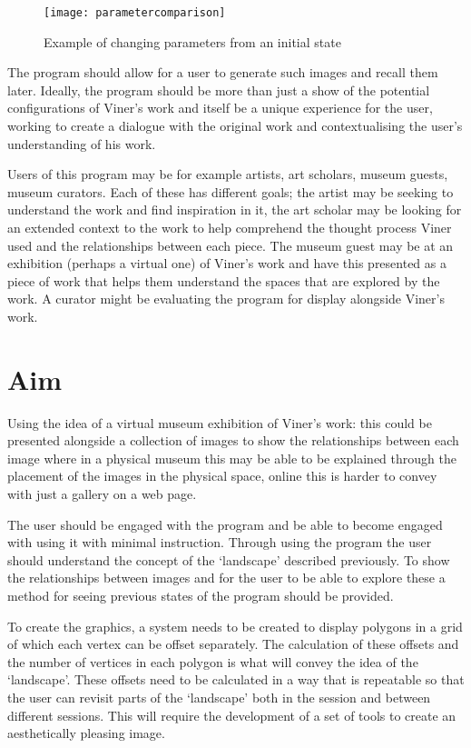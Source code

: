 \begin{figure}[H]
    \centering
    \texttt{[image: parametercomparison]}
    \caption{Example of changing parameters from an initial state}
\end{figure}

The program should allow for a user to generate such images and recall them
later. Ideally, the program should be more than just a show of the potential
configurations of Viner's work and itself be a unique experience for the user,
working to create a dialogue with the original work and contextualising the
user's understanding of his work.

Users of this program may be for example artists, art scholars, museum guests,
museum curators. Each of these has different goals; the artist may be seeking
to understand the work and find inspiration in it, the art scholar may be
looking for an extended context to the work to help comprehend the thought
process Viner used and the relationships between each piece. The museum guest may be
at an exhibition (perhaps a virtual one) of Viner's work and have this presented
as a piece of work that helps them understand the spaces that are explored by
the work. A curator might be evaluating the program for display alongside
Viner's work.

\section{Aim}
Using the idea of a virtual museum exhibition of Viner's work: this could be
presented alongside a collection of images to show the relationships between
each image where in a physical museum this may be able to be explained through
the placement of the images in the physical space, online this is harder to
convey with just a gallery on a web page.

The user should be engaged with the program and be able to become engaged with
using it with minimal instruction. Through using the program the user should
understand the concept of the `landscape' described previously. To show the
relationships between images and for the user to be able to explore these a
method for seeing previous states of the program should be provided.

To create the graphics, a system needs to be created to display polygons in a
grid of which each vertex can be offset separately. The calculation of these
offsets and the number of vertices in each polygon is what will convey the idea
of the `landscape'. These offsets need to be calculated in a way that is
repeatable so that the user can revisit parts of the `landscape' both in the
session and between different sessions. This will require the development of a
set of tools to create an aesthetically pleasing image.

